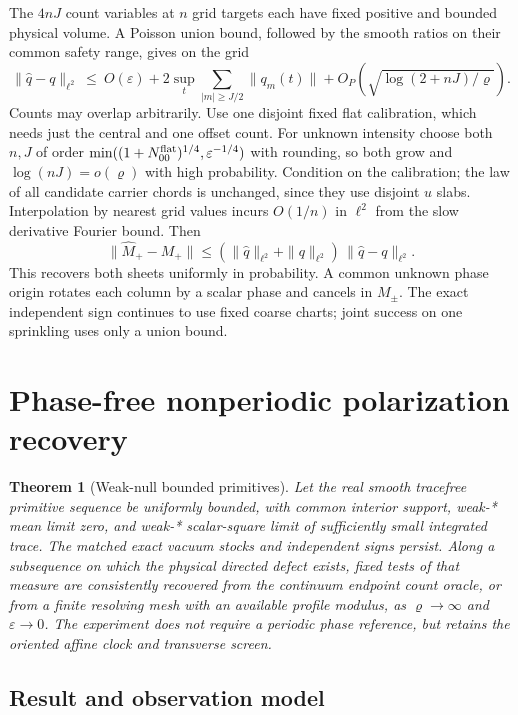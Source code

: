 \documentclass[11pt]{article}
\newtheorem{theorem}{Theorem}
\begin{document}
The \(4nJ\) count variables at \(n\) grid targets each have fixed positive and bounded physical volume. A Poisson union bound, followed by the smooth ratios on their common safety range, gives on the grid
\[
\|\widehat q-q\|_{\ell^2}\ \le\
O(\varepsilon)
+2\sup_t\sum_{|m|\ge J/2}\|q_m(t)\|
+O_P\!\left(\sqrt{\log(2+nJ)/\varrho}\right).
\]
Counts may overlap arbitrarily. Use one disjoint fixed flat calibration, which needs just the central and one offset count. For unknown intensity choose both \(n,J\) of order \(\min((1+N^{\rm flat}_{00})^{1/4},\varepsilon^{-1/4})\) with rounding, so both grow and \(\log(nJ)=o(\varrho)\) with high probability. Condition on the calibration; the law of all candidate carrier chords is unchanged, since they use disjoint \(u\) slabs. Interpolation by nearest grid values incurs \(O(1/n)\) in \(\ell^2\) from the slow derivative Fourier bound. Then
\[
\|\widehat M_+-M_+\|
 \le(\|\widehat q\|_{\ell^2}+\|q\|_{\ell^2})\,\|\widehat q-q\|_{\ell^2}.
\]
This recovers both sheets uniformly in probability. A common unknown phase origin rotates each column by a scalar phase and cancels in \(M_\pm\). The exact independent sign continues to use fixed coarse charts; joint success on one sprinkling uses only a union bound.



\section{Phase-free nonperiodic polarization recovery}\label{sec:nonperiodic}
\begin{theorem}[Weak-null bounded primitives]\label{thm:nonperiodic}
Let the real smooth tracefree primitive sequence be uniformly
bounded, with common interior support, weak-* mean limit zero,
and weak-* scalar-square limit of sufficiently small integrated
trace. The matched exact vacuum stocks and independent signs
persist. Along a subsequence on which the physical directed defect
exists, fixed tests of that measure are consistently recovered
from the continuum endpoint count oracle, or from a finite
resolving mesh with an available profile modulus, as
\(\varrho\to\infty\) and \(\varepsilon\to0\).
The experiment does not require a periodic phase reference, but
retains the oriented affine clock and transverse screen.
\end{theorem}
\subsection{Result and observation model}\label{result-and-observation-model}
\end{document}

